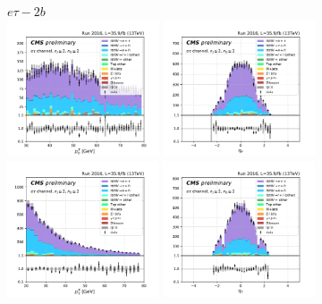 \begin{figure}[ht]
    \centering
    $e\tau - 2b$ \\
    \includegraphics[width=0.4\textwidth]{chapters/Analysis/sectionPlots/figures/kinematics_pickles/etau/2b/etau_2b_lepton1_pt.pdf}
    \includegraphics[width=0.4\textwidth]{chapters/Analysis/sectionPlots/figures/kinematics_pickles/etau/2b/etau_2b_lepton1_eta.pdf}
    \includegraphics[width=0.4\textwidth]{chapters/Analysis/sectionPlots/figures/kinematics_pickles/etau/2b/etau_2b_lepton2_pt.pdf}
    \includegraphics[width=0.4\textwidth]{chapters/Analysis/sectionPlots/figures/kinematics_pickles/etau/2b/etau_2b_lepton2_eta.pdf}

\end{figure}
